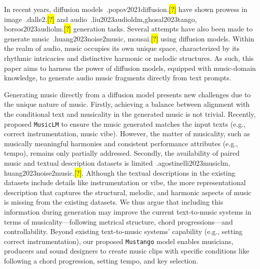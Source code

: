 \documentclass[11pt]{article}
\let\realcite\cite
\renewcommand{\cite}[1]{\ifx.#1.\hl{[?]}\else\realcite{#1}\fi}
\newcommand{\model}{\texttt{Mustango}}
\begin{document}
In recent years, diffusion models~\cite{popov2021diffusion} have shown prowess in image~\cite{dalle2} and audio~\cite{liu2023audioldm,ghosal2023tango, borsos2023audiolm} generation tasks. Several attempts have also been made to generate music~\cite{huang2023noise2music, mousai} using diffusion models. Within the realm of audio, music occupies its own unique space, characterized by its rhythmic intricacies and distinctive harmonic or melodic structures. As such, this paper aims to harness the power of diffusion models, equipped with music-domain knowledge, to generate audio music fragments directly from text prompts.

Generating music directly from a diffusion model presents new challenges due to the unique nature of music. Firstly, achieving a balance between alignment with the conditional text and musicality in the generated music is not trivial. Recently, \citet{agostinelli2023musiclm} proposed \texttt{MusicLM} to ensure the music generated matches the input texts (e.g., correct instrumentation, music vibe). However, the matter of musicality, such as musically meaningful harmonies and consistent performance attributes (e.g., tempo), remains only partially addressed. Secondly, the availability of paired music and textual description datasets is limited~\cite{agostinelli2023musiclm, huang2023noise2music}. Although the textual descriptions in the existing datasets include details like instrumentation or vibe, the more representational description that captures the structural, melodic, and harmonic aspects of music is missing from the existing datasets. We thus argue that including this information during generation may improve the current text-to-music systems in terms of musicality---following metrical structure, chord progressions---and controllability. Beyond existing text-to-music systems' capability (e.g., setting correct instrumentation), our proposed \model{} model enables musicians, producers and sound designers to create music clips with specific conditions like following a chord progression, setting tempo, and key selection.
\end{document}
